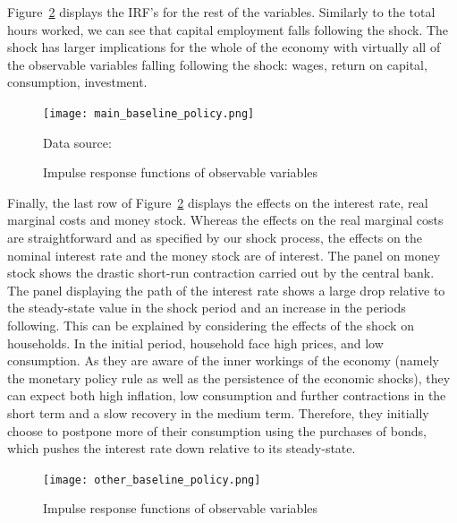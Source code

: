 \documentclass[12pt]{article}
\begin{document}
Figure~\ref{fig:other_baseline} displays the IRF's for the rest of the variables. Similarly to the total hours worked, we can see that capital employment falls following the shock. The shock has larger implications for the whole of the economy with virtually all of the observable variables falling following the shock: wages, return on capital, consumption, investment. 

\begin{figure}[!h]
    \caption{Impulse response functions of observable variables}\label{fig:main_baseline}
    \centering
    \texttt{[image: main\_baseline\_policy.png]}
    
    \tiny{Data source: \citeauthor{worldbank_inflation_ca}}
\end{figure}

Finally, the last row of Figure~\ref{fig:other_baseline} displays the effects on the interest rate, real marginal costs and money stock. Whereas the effects on the real marginal costs are straightforward and as specified by our shock process, the effects on the nominal interest rate and the money stock are of interest. The panel on money stock shows the drastic short-run contraction carried out by the central bank. The panel displaying the path of the interest rate shows a large drop relative to the steady-state value in the shock period and an increase in the periods following. This can be explained by considering the effects of the shock on households. In the initial period, household face high prices, and low consumption. As they are aware of the inner workings of the economy (namely the monetary policy rule as well as the persistence of the economic shocks), they can expect both high inflation, low consumption and further contractions in the short term and a slow recovery in the medium term. Therefore, they initially choose to postpone more of their consumption using the purchases of bonds, which pushes the interest rate down relative to its steady-state. 

\begin{figure}[!h]
    \caption{Impulse response functions of observable variables}\label{fig:other_baseline}
    \centering
    \texttt{[image: other\_baseline\_policy.png]}
\end{figure}
\end{document}
